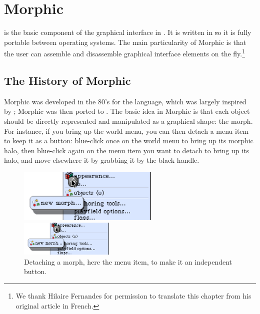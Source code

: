 \documentclass[a4paper,10pt,twoside]{book}
\begin{document}
	\renewcommand{\nnbb}[2]{} %
	\sloppy
\fi
\chapter{Morphic}


 is the basic component of the graphical interface in \sq.
It is written in \st so it is fully portable between operating systems.
The main particularity of Morphic is that the user can assemble and disassemble graphical interface elements on the fly.\footnote{We thank Hilaire Fernandes for permission to translate this chapter from his original article in French.}


\section{The History of Morphic}

Morphic was developed in the 80's for the  language, which was largely inspired by \st; Morphic was then ported to \sq.
The basic idea in Morphic is that each object should be directly represented and manipulated as a graphical shape: the morph.
For instance, if you bring up the world menu, you can then detach a menu item to keep it as a button:
blue-click once on the world menu to bring up its morphic halo, then blue-click again on the menu item you want to detach to bring up its halo, and move elsewhere it by grabbing it by the black handle.

\begin{figure}[ht]
	\ifluluelse
		{\centerline{\includegraphics[width=0.6\textwidth]{detachingMenu}}}
		{\centerline{\includegraphics[width=0.4\textwidth]{detachingMenu}}}
	\caption{Detaching a morph, here the  menu item, to make it an independent button.
		\label{fig:detachingMenu}}
\end{figure}
\end{document}
